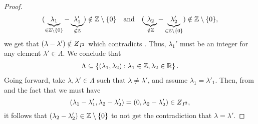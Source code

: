 \documentclass[../thesis.tex]{subfiles}
\begin{document}
\begin{proof}
    \begin{align*}  %
        \brac{\underbrace{\lambda_1}_{\in \intnozero}-\underbrace{\lambda_1'}_{\notin \Z}} \notin \intnozero
        \quad \text{and} \quad
        \brac{\underbrace{\lambda_2}_{\notin \Z}-\underbrace{\lambda_2'}_{\in \intnozero}} \notin \intnozero,
    \end{align*}
    we get that $\brac{\lambda-\lambda'} \notin \Zstroke_{I^2}$ which contradicts . Thus, $\lambda_1'$ must be an integer for any element $\lambda'\in \Lambda$. We conclude that %
    \begin{align*}  %
        \Lambda \subseteq \braqMed{ \bracMed{\lambda_1, \lambda_2} : \lambda_1 \in \Z, \lambda_2 \in \R}.
    \end{align*}
    Going forward, take $\lambda, \lambda' \in \Lambda$ such that $\lambda\neq \lambda'$, and assume $\lambda_1 = \lambda'_1$. Then, from  and the fact that we must have  %
    \begin{equation*}
        \brac{\lambda_1-\lambda'_1,\lambda_2-\lambda'_2} = \brac{0,\lambda_2-\lambda'_2}\in \Zstroke_{I^2},
    \end{equation*}
    it follows that $(\lambda_2 - \lambda_2') \in \mathbb{Z}\setminus\{0\}$ to not get the contradiction that $\lambda=\lambda'$.  %

\end{proof}
\end{document}
